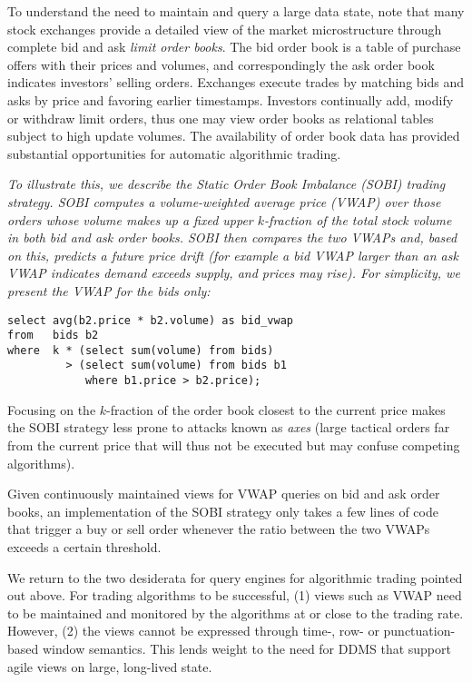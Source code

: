 To understand the need to maintain and query a large data state, note that
many stock exchanges provide a detailed view of the market microstructure
through complete bid and ask {\em limit order books}. The bid order book is a
table of purchase offers with their prices and volumes, and correspondingly the
ask order book indicates investors' selling orders. Exchanges execute trades by
matching bids and asks by price and favoring earlier timestamps. Investors
continually add, modify or withdraw limit orders, thus one may view order books
as relational tables subject to high update volumes. The availability of order
book data has provided substantial opportunities for automatic algorithmic
trading.


\begin{example}\em
To illustrate this, we describe the Static Order Book Imbalance (SOBI) trading
strategy. SOBI computes a volume-weighted average price (VWAP) over those orders
whose volume makes up a fixed upper $k$-fraction of the total stock volume in
both bid and ask order books. SOBI then compares the two VWAPs and, based on
this, predicts a future price drift (for example a bid VWAP larger than an ask
VWAP indicates demand exceeds supply, and prices may rise). For simplicity, we
present the VWAP for the bids only:

\begin{verbatim}
select avg(b2.price * b2.volume) as bid_vwap
from   bids b2
where  k * (select sum(volume) from bids)
         > (select sum(volume) from bids b1
            where b1.price > b2.price);
\end{verbatim}

Focusing on the $k$-fraction of the order book closest to the current price
makes the SOBI strategy less prone to attacks known as {\em axes}\/ (large
tactical orders far from the current price that will thus not be executed but
may confuse competing algorithms).

Given continuously maintained views for VWAP queries on bid and ask order
books, an implementation of the SOBI strategy only takes a few lines of code
that trigger a buy or sell order whenever the ratio between the two VWAPs
exceeds a certain threshold. 
\punto
\end{example}


We return to the two desiderata for query engines for algorithmic trading
pointed out above. For trading algorithms to be successful, (1)
views such as VWAP need to be maintained and monitored by the algorithms at or
close to the trading rate. However, (2) the views cannot be expressed through
time-, row- or punctuation-based window semantics.
This lends weight to the need for DDMS that support agile views on
large, long-lived state.




